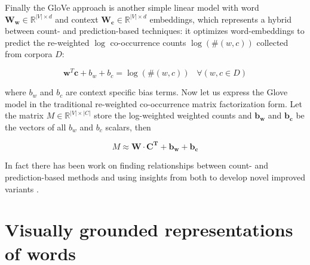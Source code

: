 Finally the GloVe approach \citep{pennington2014glove} is another simple linear model
with word $\mathbf{W_w}  \in \mathbb{R}^{|V| \times d}$ and context
$\mathbf{W_c} \in \mathbb{R}^{|V| \times d}$ embeddings, which
represents a hybrid between count- and prediction-based techniques:
it optimizes word-embeddings to predict the re-weighted
$\log$ co-occurrence counts $\log(\#(w,c))$ collected from corpora $D$:

\begin{equation}
\label{eq:glove}
\mathbf{w}^T\mathbf{c} + b_w + b_c = \log(\#(w,c))\;\;\; \forall (w,c \in D)
\end{equation}

where $b_w$ and $b_c$ are context specific bias terms.
Now let us express the Glove model in the traditional re-weighted
co-occurrence matrix factorization form.
Let the matrix $M \in \mathbb{R}^{|V| \times |C|}$ store the log-weighted
weighted counts and $\mathbf{b_w}$ and $\mathbf{b_c}$ be the vectors of all
$b_w$ and $b_c$ scalars, then

\begin{equation}
\label{eq:glove2}
M \approx \mathbf{W} \cdot \mathbf{C^T} + \mathbf{b_w} + \mathbf{b_c}
\end{equation}

In fact there has been work on finding relationships between
count- and prediction-based methods \citep{levy2014neural} and
using insights from both to develop novel improved
variants \citep{levy2015improving}.





\section{Visually grounded representations of words}
\label{sec:visualwords}

